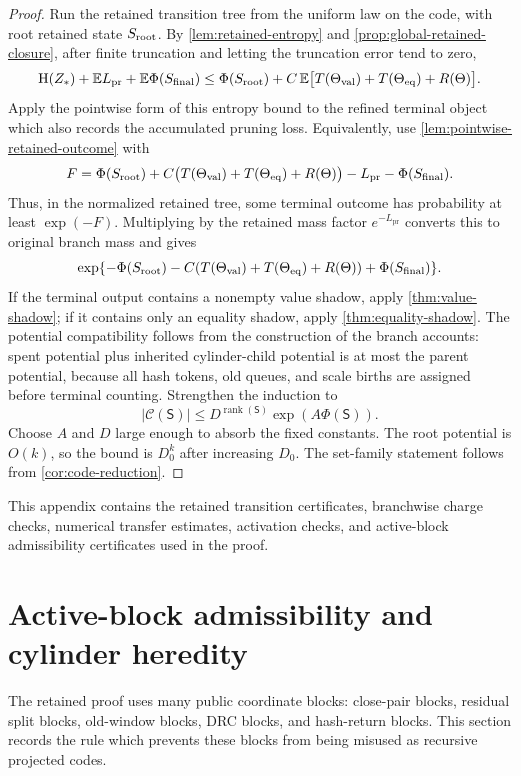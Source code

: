 \documentclass[11pt]{article}
\newcommand{\Cref}[1]{\ref{#1}}
\theoremstyle{remark}
\newcommand{\C}{\mathcal C}
\newcommand{\E}{\mathbb E}
\newcommand{\HH}{\mathrm H}
\newcommand{\rank}{\operatorname{rank}}
\newcommand{\State}{\mathsf S}
\newcommand{\pr}{\mathrm{pr}}
\begin{document}
\begin{proof}
Run the retained transition tree from the uniform law on the code, with root retained state $S_{\rm root}$.  By \Cref{lem:retained-entropy} and \Cref{prop:global-retained-closure}, after finite truncation and letting the truncation error tend to zero,
\[
        \HH(Z_*)+\E L_{\pr}+\E\Phi(S_{\rm final})
        \le \Phi(S_{\rm root})
        +C\,\E\bigl[T(\Theta_{\rm val})+T(\Theta_{\rm eq})+R(\Theta)\bigr].
\]
Apply the pointwise form of this entropy bound to the refined terminal object which also records the accumulated pruning loss.  Equivalently, use \Cref{lem:pointwise-retained-outcome} with
\[
        F=\Phi(S_{\rm root})
        +C\bigl(T(\Theta_{\rm val})+T(\Theta_{\rm eq})+R(\Theta)\bigr)
        -L_{\pr}-\Phi(S_{\rm final}).
\]
Thus, in the normalized retained tree, some terminal outcome has probability at least $\exp(-F)$.  Multiplying by the retained mass factor $e^{-L_{\pr}}$ converts this to original branch mass and gives
\[
        \exp\{-\Phi(S_{\rm root})-C(T(\Theta_{\rm val})+T(\Theta_{\rm eq})+R(\Theta))+\Phi(S_{\rm final})\}.
\]
If the terminal output contains a nonempty value shadow, apply \Cref{thm:value-shadow}; if it contains only an equality shadow, apply \Cref{thm:equality-shadow}.  The potential compatibility follows from the construction of the branch accounts: spent potential plus inherited cylinder-child potential is at most the parent potential, because all hash tokens, old queues, and scale births are assigned before terminal counting.  Strengthen the induction to
\[
        |\C(\State)|\le D^{\rank(\State)}\exp(A\Phi(\State)).
\]
Choose $A$ and $D$ large enough to absorb the fixed constants.  The root potential is $O(k)$, so the bound is $D_0^k$ after increasing $D_0$.  The set-family statement follows from \Cref{cor:code-reduction}.
\end{proof}




This appendix contains the retained transition certificates, branchwise charge checks, numerical transfer estimates, activation checks, and active-block admissibility certificates used in the proof.

\appendix


\section{Active-block admissibility and cylinder heredity}\label{app:active-admissibility}

The retained proof uses many public coordinate blocks: close-pair blocks, residual split blocks, old-window blocks, DRC blocks, and hash-return blocks.  This section records the rule which prevents these blocks from being misused as recursive projected codes.
\end{document}
